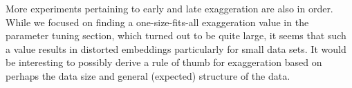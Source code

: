 More experiments pertaining to early and late exaggeration are also in order. While we
focused on finding a one-size-fits-all exaggeration value in the parameter tuning section,
which turned out to be quite large, it seems that such a value results in distorted embeddings
particularly for small data sets. It would be interesting to possibly derive a rule of thumb
for exaggeration based on perhaps the data size and general (expected) structure of
the data.

